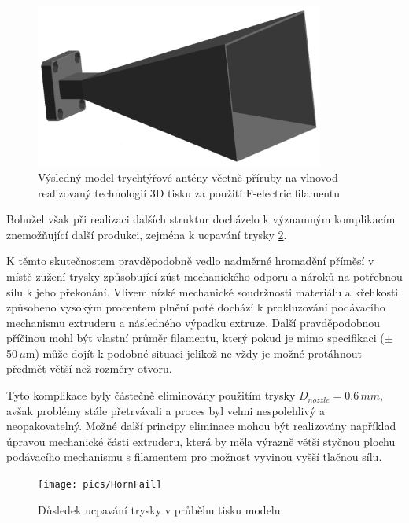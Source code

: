 \begin{figure}[h]
\begin{center}
\includegraphics[width=9.5cm]{pics/HornFinal}
\caption{Výsledný model trychtýřové antény včetně příruby na vlnovod realizovaný technologií 3D tisku za použití F-electric filamentu}
\label{fig:HornRealFe}
\end{center}
\end{figure}

Bohužel však při realizaci dalších struktur docházelo k významným komplikacím znemožňující další produkci, zejména k ucpavání trysky \ref{fig:HornFail}.

K těmto skutečnostem pravděpodobně vedlo nadměrné hromadění příměsí v místě zužení trysky způsobující zúst mechanického odporu a nároků na potřebnou sílu k jeho překonání. Vlivem nízké mechanické soudržnosti materiálu a křehkosti způsobeno vysokým procentem plnění poté dochází k prokluzování podávacího mechanismu extruderu a následného výpadku extruze. Další pravděpodobnou příčinou mohl být vlastní průměr filamentu, který pokud je mimo specifikaci ($\pm$50\,$\mu$m) může dojít k podobné situaci jelikož ne vždy je možné protáhnout předmět větší než rozměry otvoru. 

Tyto komplikace byly částečně eliminovány použitím trysky $D_{nozzle} = 0.6\,mm$, avšak problémy stále přetrvávali a proces byl velmi nespolehlivý a neopakovatelný. Možné další principy eliminace mohou být realizovány například úpravou mechanické části extruderu, která by měla výrazně větší styčnou plochu podávacího mechanismu s filamentem pro možnost vyvinou vyšší tlačnou sílu.

\begin{figure}[h]
\begin{center}
\texttt{[image: pics/HornFail]}
\caption{Důsledek ucpavání trysky v průběhu tisku modelu}
\label{fig:HornFail}
\end{center}
\end{figure}


